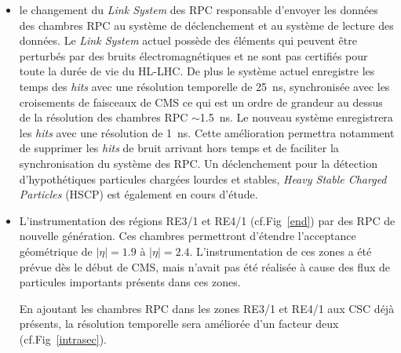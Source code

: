 \begin{itemize}[label=$\bullet$]
	\item le changement du \textit{Link System} des RPC responsable d'envoyer les données des chambres RPC au système de déclenchement et au système de lecture des données. Le \textit{Link System} actuel possède des éléments qui peuvent être perturbés par des bruits électromagnétiques et ne sont pas certifiés pour toute la durée de vie du HL-LHC. De plus le système actuel enregistre les temps des \textit{hits} avec une résolution temporelle de \SI{25}{\nano\second}, synchronisée avec les croisements de faisceaux de CMS ce qui est un ordre de grandeur au dessus de la résolution des chambres RPC $\sim$\SI{1.5}{\nano\second}. Le nouveau système enregistrera les \textit{hits} avec une résolution de \SI{1}{\nano\second}. Cette amélioration permettra notamment de supprimer les \textit{hits} de bruit arrivant hors temps et de faciliter la synchronisation du système des RPC. Un déclenchement pour la détection d'hypothétiques particules chargées lourdes et stables, \textit{Heavy Stable Charged Particles} (HSCP) est également en cours d'étude.
	
	\item L'instrumentation des régions RE3/1 et RE4/1 (cf.Fig~\ref{end}) par des RPC de nouvelle génération. Ces chambres permettront d'étendre l'acceptance géométrique de $|\eta|=\num{1.9}$ à  $|\eta|=\num{2.4}$. L'instrumentation de ces zones a été prévue dès le début de CMS, mais n'avait pas été réalisée à cause des flux de particules importants présents dans ces zones. 
	
	En ajoutant les chambres RPC dans les zones RE3/1 et RE4/1 aux CSC déjà présents, la résolution temporelle sera améliorée d'un facteur deux (cf.Fig~\ref{intrasec}).
	

\end{itemize}
